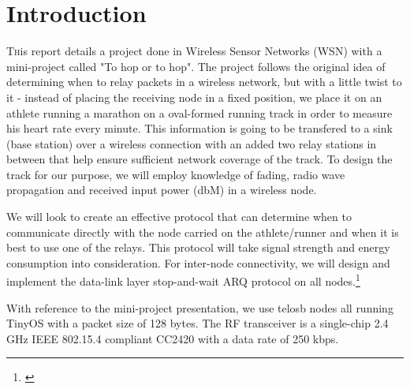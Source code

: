 \section{Introduction}\label{ch:introduction}

\lettrine[nindent=0em,lines=3]{T} his report details a project done in Wireless Sensor Networks (WSN) with a mini-project called "To hop or to hop". The project follows the original idea of determining when to relay packets in a wireless network, but with a little twist to it - instead of placing the receiving node in a fixed position, we place it on an athlete running a marathon on a oval-formed running track in order to measure his heart rate every minute. This information is going to be transfered to a sink (base station) over a wireless connection with an added two relay stations in between that help ensure sufficient network coverage of the track. To design the track for our purpose, we will employ knowledge of fading, radio wave propagation and received input power (dbM) in a wireless node.

We will look to create an effective protocol that can determine when to communicate directly with the node carried on the athlete/runner and when it is best to use one of the relays. This protocol will take signal strength and energy consumption into consideration. For inter-node connectivity, we will design and implement the data-link layer stop-and-wait ARQ protocol on all nodes.\footnote{\cite{Ieee}}

With reference to the mini-project presentation, we use telosb nodes all running TinyOS with a packet size of 128 bytes. The RF transceiver is a single-chip 2.4 GHz IEEE 802.15.4 compliant CC2420 with a data rate of 250 kbps.




